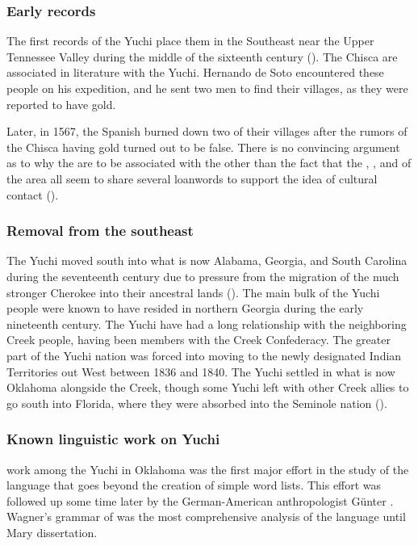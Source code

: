 \documentclass[output=paper]{LSP/langsci}
\begin{document}
\subsubsection{Early records} 

The first records of the Yuchi place them in the Southeast near the Upper Tennessee Valley during the middle of the sixteenth century (\citealt{Gatschet1885}). The Chisca are associated in literature with the Yuchi. Hernando de Soto encountered these people on his expedition, and he sent two men to find their villages, as they were reported to have gold. 

Later, in 1567, the Spanish burned down two of their villages after the rumors of the Chisca having gold turned out to be false. There is no convincing argument as to why the  are to be associated with the  other than the fact that the , , and  of the area all seem to share several loanwords to support the idea of cultural contact (\citet{BookerEtAl1992}).

\subsubsection{Removal from the southeast} 

The Yuchi moved south into what is now Alabama, Georgia, and South Carolina during the seventeenth century due to pressure from the migration of the much stronger Cherokee into their ancestral lands (\citealt{Jackson2012}). The main bulk of the Yuchi people were known to have resided in northern Georgia during the early nineteenth century. The Yuchi have had a long relationship with the neighboring Creek people, having been members with the Creek Confederacy. The greater part of the Yuchi nation was forced into moving to the newly designated Indian Territories out West between 1836 and 1840. The Yuchi settled in what is now Oklahoma alongside the Creek, though some Yuchi left with other Creek allies to go south into Florida, where they were absorbed into the Seminole nation (\citealt{Mithun1999}).

\subsubsection{Known linguistic work on Yuchi} 

 work among the Yuchi in Oklahoma was the first major effort in the study of the  language that goes beyond the creation of simple word lists. This effort was followed up some time later by the German-American anthropologist G\"unter \citet{Wagner1934}. Wagner's  grammar of  was the most comprehensive analysis of the language until Mary  dissertation.
\end{document}
